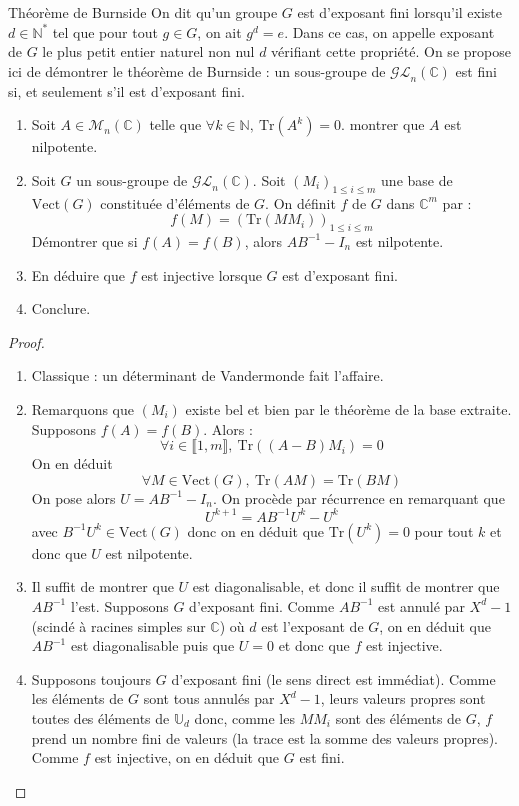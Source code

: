 \documentclass[french,a4paper]{article}
\newcommand{\N}{\mathbb{N}}
\newcommand{\C}{\mathbb{C}}
\newcommand{\U}{\mathbb{U}}
\newcommand{\st}{^*}
\newcommand{\inv}{^{-1}}
\newcommand{\Tr}{\text{Tr}}
\theoremstyle{plain}
\theoremstyle{definition}
\theoremstyle{remark}
\begin{document}
\begin{ex}{Théorème de Burnside}
	On dit qu'un groupe $G$ est d'exposant fini lorsqu'il existe $d\in\N\st$ tel que pour tout $g\in G$, on ait $g^d=e$. Dans ce cas, on appelle exposant de $G$ le plus petit entier naturel non nul $d$ vérifiant cette propriété. On se propose ici de démontrer le théorème de Burnside : un sous-groupe de $\mathcal{GL}_n(\C)$ est fini si, et seulement s'il est d'exposant fini.
	\begin{enumerate}
		\item Soit $A\in\mathcal{M}_n(\C)$ telle que $\forall k\in\N,\ \Tr(A^k)=0$. montrer que $A$ est nilpotente.
		\item Soit $G$ un sous-groupe de $\mathcal{GL}_n(\C)$. Soit $(M_i)_{1\leqslant i\leqslant m}$ une base de $\text{Vect}(G)$ constituée d'éléments de $G$. On définit $f$ de $G$ dans $\C^m$ par : $$f(M)=\left(\Tr(MM_i)\right)_{1\leqslant i\leqslant m}$$ Démontrer que si $f(A)=f(B)$, alors $AB\inv-I_n$ est nilpotente. 
		\item En déduire que $f$ est injective lorsque $G$ est d'exposant fini.
		\item Conclure.
	\end{enumerate}
\end{ex}
\begin{proof}
	\begin{enumerate}
		\item Classique : un déterminant de Vandermonde fait l'affaire.
		\item Remarquons que $(M_i)$ existe bel et bien par le théorème de la base extraite. Supposons $f(A)=f(B)$. Alors : $$\forall i\in\llbracket1,m\rrbracket,\ \Tr((A-B)M_i)=0$$ On en déduit $$\forall M\in \text{Vect}(G),\ \Tr(AM)=\Tr(BM)$$ On pose alors $U=AB\inv-I_n$. On procède par récurrence en remarquant que $$U^{k+1}=AB\inv U^k-U^k$$ avec $B\inv U^k\in\text{Vect}(G)$ donc on en déduit que $\Tr(U^k)=0$ pour tout $k$ et donc que $U$ est nilpotente.
		\item Il suffit de montrer que $U$ est diagonalisable, et donc il suffit de montrer que $AB\inv$ l'est. Supposons $G$ d'exposant fini. Comme $AB\inv$ est annulé par $X^d-1$ (scindé à racines simples sur $\C$) où $d$ est l'exposant de $G$, on en déduit que $AB\inv$ est diagonalisable puis que $U=0$ et donc que $f$ est injective.
		\item Supposons toujours $G$ d'exposant fini (le sens direct est immédiat). Comme les éléments de $G$ sont tous annulés par $X^d-1$, leurs valeurs propres sont toutes des éléments de $\U_d$ donc, comme les $MM_i$ sont des éléments de $G$, $f$ prend un nombre fini de valeurs (la trace est la somme des valeurs propres). Comme $f$ est injective, on en déduit que $G$ est fini.
	\end{enumerate}
\end{proof}
\end{document}
